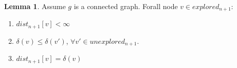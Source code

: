 \documentclass[11pt, oneside]{article}   	%
\newcommand\tab[1][1cm]{\hspace*{#1}}
\theoremstyle{definition}
\newtheorem{sublemma}{Lemma}[section]
\begin{document}



\begin{sublemma}
Assume $g$ is a connected graph. Forall node $v \in explored_{n+1}$:
\begin{enumerate}
  \item $dist_{n+1}[v] < \infty$
  \item $\delta(v) \leq \delta(v')$, $\forall v' \in unexplored_{n+1}$.
  \item $dist_{n+1}[v] = \delta(v)$
\end{enumerate}
\end{sublemma}
\end{document}
